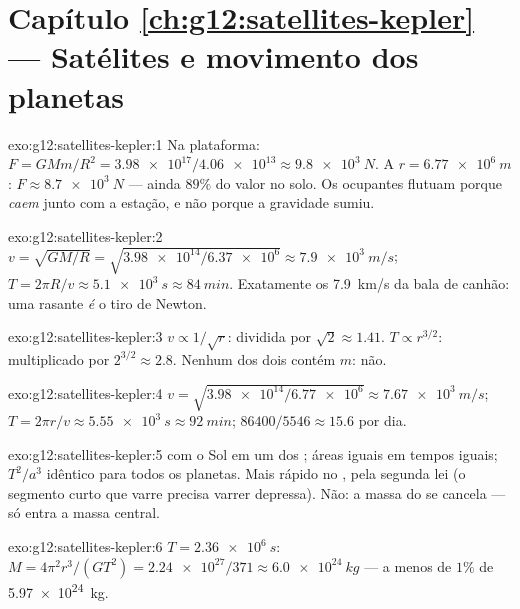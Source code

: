 \section*{Capítulo \ref{ch:g12:satellites-kepler} --- Satélites e movimento dos planetas}

\begin{solution}{exo:g12:satellites-kepler:1}
Na plataforma: $F = GMm/R^2 = \num{3.98e17}/\num{4.06e13} \approx
\qty{9.8e3}{N}$. A $r = \qty{6.77e6}{m}$: $F \approx \qty{8.7e3}{N}$
--- ainda $89\%$ do valor no solo. Os ocupantes flutuam porque
\emph{caem} junto com a estação, e não porque a gravidade sumiu.
\end{solution}

\begin{solution}{exo:g12:satellites-kepler:2}
$v = \sqrt{GM/R} = \sqrt{\num{3.98e14}/\num{6.37e6}} \approx
\qty{7.9e3}{m/s}$; $T = 2\pi R/v \approx \qty{5.1e3}{s} \approx
\qty{84}{min}$. Exatamente os \qty{7.9}{km/s} da bala de canhão: uma
 rasante \emph{é} o tiro de Newton.
\end{solution}

\begin{solution}{exo:g12:satellites-kepler:3}
$v \propto 1/\sqrt{r}$: dividida por $\sqrt 2 \approx 1.41$.
$T \propto r^{3/2}$: multiplicado por $2^{3/2} \approx 2.8$. Nenhum dos
dois contém $m$: não.
\end{solution}

\begin{solution}{exo:g12:satellites-kepler:4}
$v = \sqrt{\num{3.98e14}/\num{6.77e6}} \approx \qty{7.67e3}{m/s}$;
$T = 2\pi r/v \approx \qty{5.55e3}{s} \approx \qty{92}{min}$;
$\num{86400}/5546 \approx 15.6$  por dia.
\end{solution}

\begin{solution}{exo:g12:satellites-kepler:5}
 com o Sol em um dos ; áreas iguais em tempos iguais;
$T^2/a^3$ idêntico para todos os planetas. Mais rápido no , pela
segunda lei (o segmento curto que varre precisa varrer depressa). Não: a
massa do  se cancela --- só entra a massa central.
\end{solution}

\begin{solution}{exo:g12:satellites-kepler:6}
$T = \qty{2.36e6}{s}$: $M = 4\pi^2 r^3/(GT^2) = \num{2.24e27}/371
\approx \qty{6.0e24}{kg}$ --- a menos de $1\%$ de \qty{5.97e24}{kg}.
\end{solution}

